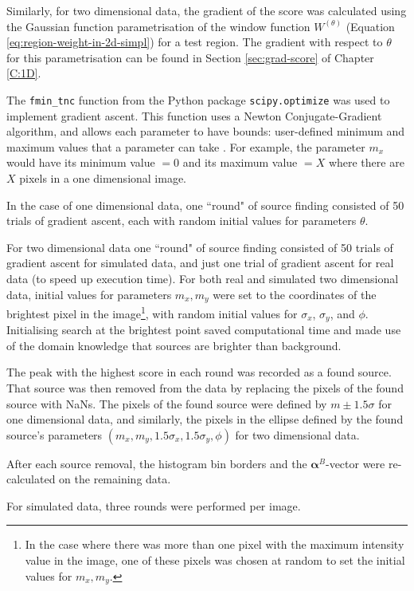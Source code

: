 Similarly, for two dimensional data, the gradient of the score was calculated using the Gaussian function parametrisation of the window function $W^{(\theta)}$ (Equation \ref{eq:region-weight-in-2d-simpl}) for a test region. The gradient with respect to $\theta$ for this parametrisation can be found in Section \ref{sec:grad-score} of Chapter \ref{C:1D}.

The \texttt{fmin\_tnc} function from the Python package \texttt{scipy.optimize} \cite{scipy} was used to implement gradient ascent. This function uses a Newton Conjugate-Gradient algorithm, and allows each parameter to have bounds: user-defined minimum and maximum values that a parameter can take \cite{scipy,nash1984newton,nocedal2006numerical}. For example, the parameter $m_x$ would have its minimum value $=0$ and its maximum value $=X$ where there are $X$ pixels in a one dimensional image.

In the case of one dimensional data, one ``round" of source finding consisted of 50 trials of gradient ascent, each with random initial values for parameters $\theta$.

For two dimensional data one ``round" of source finding consisted of 50 trials of gradient ascent for simulated data, and just one trial of gradient ascent for real data (to speed up execution time). For both real and simulated two dimensional data, initial values for parameters $m_x, m_y$ were set to the coordinates of the brightest pixel in the image\footnote{In the case where there was more than one pixel with the maximum intensity value in the image, one of these pixels was chosen at random to set the initial values for $m_x, m_y$.}, with random initial values for $\sigma_x$, $\sigma_y$, and $\phi$. Initialising search at the brightest point saved computational time and made use of the domain knowledge that sources are brighter than background.

The peak with the highest score in each round was recorded as a found source. That source was then removed from the data by replacing the pixels of the found source with NaNs. The pixels of the found source were defined by $m \pm 1.5 \sigma$ for one dimensional data, and similarly, the pixels in the ellipse defined by the found source's parameters $(m_x, m_y, 1.5\sigma_x, 1.5\sigma_y, \phi)$ for two dimensional data.

After each source removal, the histogram bin borders and the $\boldsymbol{\alpha}^B$-vector were re-calculated on the remaining data. 

For simulated data, three rounds were performed per image.

